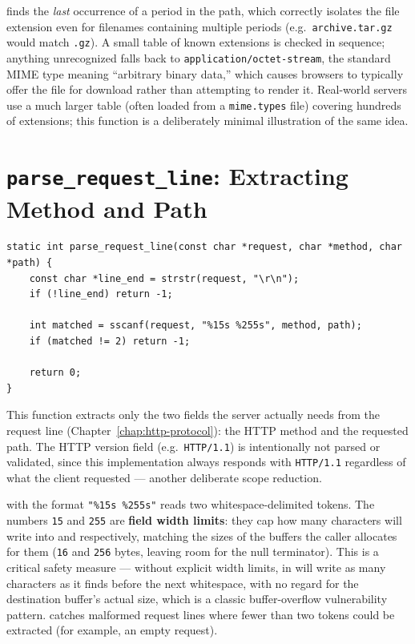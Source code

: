  finds the \emph{last} occurrence of a period in the path, which correctly isolates the file extension even for filenames containing multiple periods (e.g.\ \texttt{archive.tar.gz} would match \texttt{.gz}). A small table of known extensions is checked in sequence; anything unrecognized falls back to \texttt{application/octet-stream}, the standard MIME type meaning ``arbitrary binary data,'' which causes browsers to typically offer the file for download rather than attempting to render it. Real-world servers use a much larger table (often loaded from a \texttt{mime.types} file) covering hundreds of extensions; this function is a deliberately minimal illustration of the same idea.

\section{\texttt{parse\_request\_line}: Extracting Method and Path}

\begin{lstlisting}[style=cstyle]
static int parse_request_line(const char *request, char *method, char *path) {
    const char *line_end = strstr(request, "\r\n");
    if (!line_end) return -1;

    int matched = sscanf(request, "%15s %255s", method, path);
    if (matched != 2) return -1;

    return 0;
}
\end{lstlisting}

This function extracts only the two fields the server actually needs from the request line (Chapter~\ref{chap:http-protocol}): the HTTP method and the requested path. The HTTP version field (e.g.\ \texttt{HTTP/1.1}) is intentionally not parsed or validated, since this implementation always responds with \texttt{HTTP/1.1} regardless of what the client requested --- another deliberate scope reduction.

 with the format \texttt{"\%15s \%255s"} reads two whitespace-delimited tokens. The numbers \texttt{15} and \texttt{255} are \textbf{field width limits}: they cap how many characters  will write into  and  respectively, matching the sizes of the buffers the caller allocates for them (\texttt{16} and \texttt{256} bytes, leaving room for the null terminator). This is a critical safety measure --- without explicit width limits,  in  will write as many characters as it finds before the next whitespace, with no regard for the destination buffer's actual size, which is a classic buffer-overflow vulnerability pattern.  catches malformed request lines where fewer than two tokens could be extracted (for example, an empty request).

